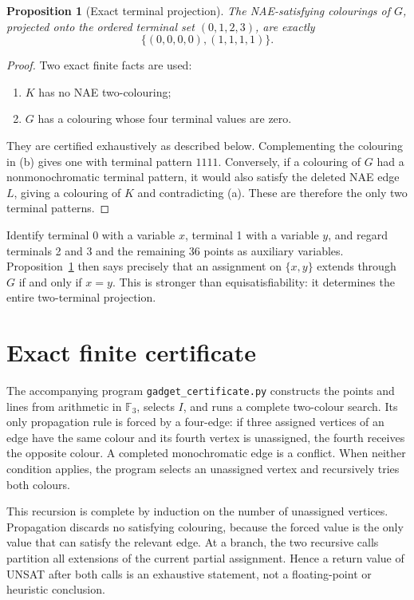 \documentclass[11pt]{article}
\newtheorem{proposition}[theorem]{Proposition}
\theoremstyle{definition}
\newcommand{\Fthree}{\mathbb F_{3}}
\begin{document}
\begin{proposition}[Exact terminal projection]\label{prop:projection}
The NAE-satisfying colourings of $G$, projected onto the ordered terminal set
$(0,1,2,3)$, are exactly
\[
   \{(0,0,0,0),(1,1,1,1)\}.
\]
\end{proposition}

\begin{proof}
Two exact finite facts are used:
\begin{enumerate}[label=\textup{(\alph*)}]
  \item $K$ has no NAE two-colouring;
  \item $G$ has a colouring whose four terminal values are zero.
\end{enumerate}
They are certified exhaustively as described below.  Complementing the
colouring in (b) gives one with terminal pattern $1111$.  Conversely, if a
colouring of $G$ had a nonmonochromatic terminal pattern, it would also
satisfy the deleted NAE edge $L$, giving a colouring of $K$ and contradicting
(a).  These are therefore the only two terminal patterns.
\end{proof}

Identify terminal 0 with a variable $x$, terminal 1 with a variable $y$, and
regard terminals 2 and 3 and the remaining 36 points as auxiliary variables.
Proposition~\ref{prop:projection} then says precisely that an assignment on
$\{x,y\}$ extends through $G$ if and only if $x=y$.  This is stronger than
equisatisfiability: it determines the entire two-terminal projection.

\section{Exact finite certificate}\label{sec:certificate}

The accompanying program \texttt{gadget\_certificate.py} constructs the
points and lines from arithmetic in $\Fthree$, selects $I$, and runs a complete
two-colour search.  Its only propagation rule is forced by a four-edge: if
three assigned vertices of an edge have the same colour and its fourth vertex
is unassigned, the fourth receives the opposite colour.  A completed
monochromatic edge is a conflict.  When neither condition applies, the
program selects an unassigned vertex and recursively tries both colours.

This recursion is complete by induction on the number of unassigned
vertices.  Propagation discards no satisfying colouring, because the forced
value is the only value that can satisfy the relevant edge.  At a branch,
the two recursive calls partition all extensions of the current partial
assignment.  Hence a return value of UNSAT after both calls is an exhaustive
statement, not a floating-point or heuristic conclusion.
\end{document}
